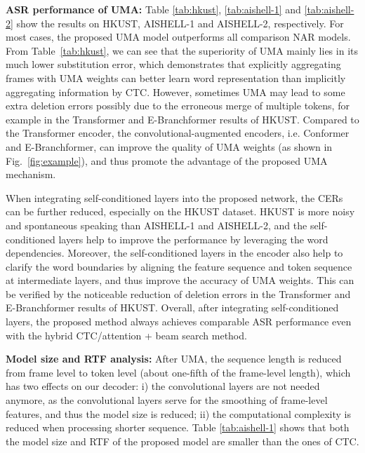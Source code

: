 \documentclass{article}
\begin{document}
\noindent\textbf{ASR performance of UMA: } Table \ref{tab:hkust}, \ref{tab:aishell-1} and \ref{tab:aishell-2} show the results on HKUST, AISHELL-1 and AISHELL-2, respectively. For most cases, the proposed UMA model outperforms all comparison NAR models. From Table~\ref{tab:hkust}, we can see that the superiority of UMA mainly lies in its much lower substitution error, which demonstrates that explicitly aggregating frames with UMA weights can better learn word representation than implicitly aggregating information by CTC. However, sometimes UMA may lead to some extra deletion errors possibly due to the erroneous merge of multiple tokens, for example in the Transformer and E-Branchformer results of HKUST. Compared to the Transformer encoder, the convolutional-augmented encoders, i.e. Conformer and E-Branchformer, can improve the quality of UMA weights (as shown in Fig.~\ref{fig:example}), and thus promote the advantage of the proposed UMA mechanism.

When integrating self-conditioned layers into the proposed network, the CERs can be further reduced, especially on the HKUST dataset. HKUST is more noisy and spontaneous speaking than AISHELL-1 and AISHELL-2, and the self-conditioned layers help to improve the performance by leveraging the word dependencies. Moreover, the self-conditioned layers in the encoder also help to clarify the word boundaries by aligning the feature sequence and token sequence at intermediate layers, and thus improve the accuracy of UMA weights. This can be verified by the noticeable reduction of deletion errors in the Transformer and E-Branchformer results of HKUST.  
Overall, after integrating self-conditioned layers, the proposed method always achieves comparable ASR performance even with the hybrid CTC/attention + beam search method.  




\noindent \textbf{Model size and RTF analysis: } 
After UMA, the sequence length is reduced from frame level to token level (about one-fifth of the frame-level length), which has two effects on our decoder: i) the convolutional layers are not needed anymore, as the convolutional layers serve for the smoothing of frame-level features, and thus the model size is reduced; ii) the computational complexity is reduced when processing shorter sequence. Table \ref{tab:aishell-1} shows that both the model size and RTF of the proposed model are smaller than the ones of CTC. 
\end{document}
